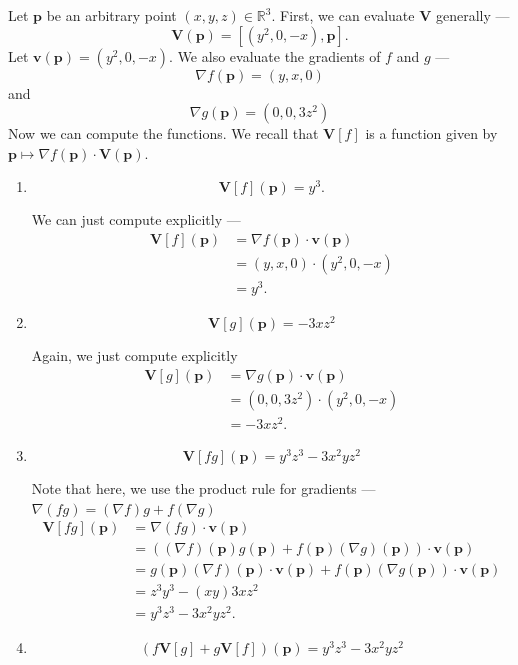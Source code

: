 \documentclass[12 pt, letterpaper]{hmcpset}
\begin{document}
\begin{solution}
	Let $\mathbf p$ be an arbitrary point $(x, y, z) \in \mathbb R^3$. First, we can evaluate $\mathbf V$ generally ---
	\[
		\mathbf V(\mathbf p) = [(y^2, 0, -x), \mathbf p].
	\]
	Let $\mathbf v(\mathbf p) = (y^2, 0, -x)$. We also evaluate the gradients of $f$ and $g$ ---
	\[
		\nabla f(\mathbf p) = (y, x, 0)	
	\]
	and
	\[
		\nabla g(\mathbf p) = (0, 0, 3z^2)
	\]
	Now we can compute the functions. We recall that $\mathbf V [f]$ is a function given by $\mathbf p \mapsto \nabla f(\mathbf p) \cdot \mathbf V(\mathbf p)$.
	\begin{enumerate}
		\item 
			\[
				\boxed{
					\mathbf V[f](\mathbf p) = y^3.
				}
			\] 

			We can just compute explicitly ---
			\[
				\begin{split}
					\mathbf V[f](\mathbf p) & = \nabla f(\mathbf p) \cdot \mathbf v(\mathbf p) \\
								& = (y, x, 0) \cdot (y^2, 0, -x) \\
								& = y^3.
				\end{split}
			\]
		\item
			\[
				\boxed{
					\mathbf V[g](\mathbf p) = - 3 x z^2
				}
			\] 

			Again, we just compute explicitly
			\[
				\begin{split}
					\mathbf V[g](\mathbf p) & = \nabla g(\mathbf p) \cdot \mathbf v(\mathbf p) \\
								& = (0, 0, 3z^2) \cdot (y^2, 0, -x) \\
								& = - 3x z^2.
				\end{split}
			\]
		\item
			\[
				\boxed{
					\mathbf V[fg](\mathbf p) = y^3 z^3 - 3 x^2 y z^2
				}
			\] 

			Note that here, we use the product rule for gradients --- $\nabla(fg) = (\nabla f) g + f (\nabla g)$
			\[
				\begin{split}
					\mathbf V[fg](\mathbf p) & = \nabla(fg) \cdot \mathbf v(\mathbf p) \\
								 & = ((\nabla f)(\mathbf p) g(\mathbf p) + f(\mathbf p) (\nabla g)(\mathbf p)) \cdot \mathbf v(\mathbf p) \\
								 & = g(\mathbf p) (\nabla f)(\mathbf p) \cdot \mathbf v(\mathbf p) + f(\mathbf p) (\nabla g(\mathbf p)) \cdot \mathbf v(\mathbf p) \\
								 & = z^3 y^3 - (xy)3xz^2 \\
								 & = y^3 z^3 - 3 x^2 y z^2.
				\end{split}
			\]
		\item
			\[
				\boxed{
					(f \mathbf V[g] + g \mathbf V[f])(\mathbf p) = y^3 z^3 - 3 x^2 y z^2
				}
			\] 


\end{enumerate}
\end{solution}
\end{document}
